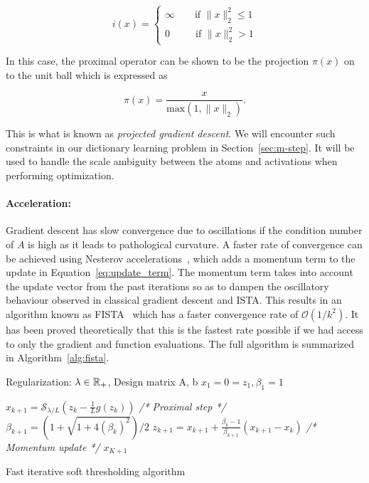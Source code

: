 \begin{equation}
i(x) = \begin{cases}
\infty \qquad \text{if } \|x\|_2^2 \leq 1 \\
0 \qquad \hspace{7pt}\text{if } \|x\|_2^2 > 1
\end{cases}
\end{equation}

In this case, the proximal operator can be shown to be the projection $\pi(x)$ on to the unit ball which is expressed as

\begin{equation}
\pi(x) = \frac{x}{\mathrm{max}(1, \|x\|_2)}.
\end{equation} 

This is what is known as \textit{projected gradient descent}. We will encounter such constraints in our dictionary learning problem in Section~\ref{sec:m-step}. It will be used to handle the scale ambiguity between the atoms and activations when performing optimization.

\paragraph{Acceleration:} Gradient descent has slow convergence due to oscillations if the condition number of $A$ is high as it leads to pathological curvature. A faster rate of convergence can be achieved using Nesterov accelerations~\citep{nesterov1983method}, which adds a momentum term to the update in Equation~\ref{eq:update_term}.
The momentum term takes into account the update vector from the past iterations so as to dampen the oscillatory behaviour observed in classical gradient descent and \ac{ISTA}. 
This results in an algorithm known as \ac{FISTA}~\citep{beck2009fast} which has a faster convergence rate of $\mathcal{O}(1/k^2)$. It has been proved theoretically that this is the fastest rate possible if we had access to only the gradient and function evaluations. The full algorithm is summarized in Algorithm~\ref{alg:fista}.

    \begin{algorithm}[H]
      \begin{algorithmic}[1] %
      \REQUIRE Regularization: $\lambda \in \mathbb{R}_+$, Design matrix A, b
      \STATE $x_1=0=z_1, \beta_1=1$
          
          \STATE $x_{k+1} = \mathcal{S}_{\lambda/L}(z_k - \frac{1}{L}g(z_k))$ \textit{\color{blue} /* Proximal step */}
          \STATE $\beta_{k+1} = (1 + \sqrt{1 + 4(\beta_k)^2})/2$
          \STATE $z_{k + 1} = x_{k + 1} + \frac{\beta_k - 1}{\beta_{k + 1}}(x_{k + 1} - x_k)$ \textit{\color{blue} /* Momentum update */}
        \ENDFOR
        \RETURN $x_{K + 1}$
        \end{algorithmic}
        \caption{Fast iterative soft thresholding algorithm}
        \label{alg:fista}
    \end{algorithm}

